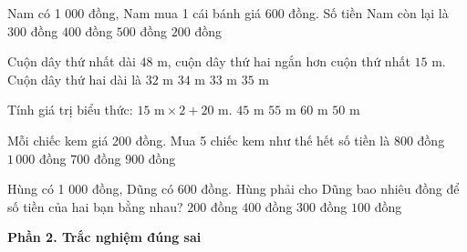 \begin{ex} %
Nam có 1 000 đồng, Nam mua 1 cái bánh giá 600 đồng. Số tiền Nam còn lại là
\choice
{$300$ đồng}
{\True $400$ đồng}
{$500$ đồng}
{$200$ đồng}
\end{ex}

\begin{ex} %
Cuộn dây thứ nhất dài $48\text{ m}$, cuộn dây thứ hai ngắn hơn cuộn thứ nhất $15\text{ m}$. Cuộn dây thứ hai dài là
\choice
{$32\text{ m}$}
{$34\text{ m}$}
{\True $33\text{ m}$}
{$35\text{ m}$}
\end{ex}

\begin{ex} %
Tính giá trị biểu thức: $15\text{ m} \times 2 + 20\text{ m}$.
\choice
{$45\text{ m}$}
{$55\text{ m}$}
{$60\text{ m}$}
{\True $50\text{ m}$}
\end{ex}

\begin{ex} %
Mỗi chiếc kem giá 200 đồng. Mua 5 chiếc kem như thế hết số tiền là
\choice
{$800$ đồng}
{\True $1\,000$ đồng}
{$700$ đồng}
{$900$ đồng}
\end{ex}

\begin{ex} %
Hùng có 1 000 đồng, Dũng có 600 đồng. Hùng phải cho Dũng bao nhiêu đồng để số tiền của hai bạn bằng nhau?
\choice
{\True $200$ đồng}
{$400$ đồng}
{$300$ đồng}
{$100$ đồng}
\end{ex}

\textbf{Phần 2. Trắc nghiệm đúng sai}

